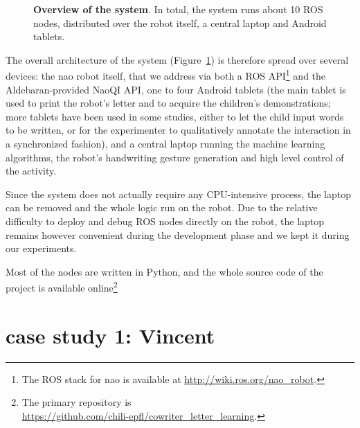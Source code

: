 \documentclass{sig-alternate}
\begin{document}
\begin{figure}[ht!]
{
}

\caption{\small \textbf{Overview of the system}. In total, the system runs about 10 ROS nodes,
    distributed over the robot itself, a central laptop and Android tablets.}

    \label{fig:archi}
\end{figure}

The overall architecture of the system (Figure~\ref{fig:archi}) is therefore
spread over several devices: the {\sc nao} robot itself, that we address via
both a ROS API\footnote{The ROS stack for {\sc nao} is available at 
\url{http://wiki.ros.org/nao_robot}.} and the Aldebaran-provided NaoQI API, one
to four Android tablets (the main tablet is used to print the robot's letter and
to acquire the children's demonstrations; more tablets have been used in some
studies, either to let the child input words to be written, or for the
experimenter to qualitatively annotate the interaction in a synchronized
fashion), and a central laptop running the machine learning algorithms, the
robot's handwriting gesture generation and high level control of the activity.

Since the system does not actually require any CPU-intensive process, the laptop
can be removed and the whole logic run on the robot. Due to the relative
difficulty to deploy and debug ROS nodes directly on the robot, the laptop
remains however convenient during the development phase and we kept it during
our experiments.

Most of the nodes are written in Python, and the whole source code of the
project is available online\footnote{The primary repository is\\ 
\url{https://github.com/chili-epfl/cowriter_letter_learning}.}


\section{case study 1: Vincent}\label{Vincent}
\end{document}
